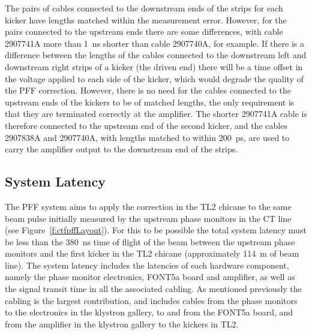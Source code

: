 The pairs of cables connected to the downstream ends of the strips for
 each kicker have lengths matched within the measurement error.
 However, for the pairs connected to the upstream ends there are some differences, with cable 2907741A more than 1~ns shorter than cable 2907740A, for example. If there is a difference between the lengths of the cables connected to the downstream left and downstream right strips of a kicker (the driven end) there will be a time offset in the voltage applied to each side of the kicker, which would degrade the quality of the PFF correction. However, there is no need for the cables connected to the upstream ends of the kickers to be of matched lengths, the only requirement is that they are terminated correctly at the amplifier. The shorter 2907741A cable is therefore connected to the upstream end of the second kicker, and the cables 2907838A and 2907740A, with lengths matched to within 200~ps, are used to carry the amplifier output to the downstream end of the strips.

\subsection{System Latency}
\label{ss:systLatency}

The PFF system aims to apply the correction in the TL2 chicane to the same beam pulse initially measured by the upstream phase monitors in the CT line (see Figure~\ref{f:ctfpffLayout}). For this to be possible the total system latency must be less than the 380~ns time of flight of the beam between the upstream phase monitors and the first kicker in the TL2 chicane (approximately 114~m of beam line). The system latency includes the latencies of each hardware component, namely the phase monitor electronics, FONT5a board and amplifier, as well as the signal transit time in all the associated cabling. As mentioned previously the cabling is the largest contribution, and includes cables from the phase monitors to the electronics in the klystron gallery, to and from the FONT5a board, and from the amplifier in the klystron gallery to the kickers in TL2.


